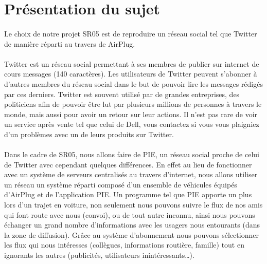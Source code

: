 
\section{Présentation du sujet}

\paragraph{}
Le choix de notre projet SR05 est de reproduire un réseau social tel que Twitter de manière réparti au travers de AirPlug.

\paragraph{}
Twitter est un réseau social permettant à ses membres de publier sur internet de cours messages (140 caractères). Les utilisateurs de Twitter peuvent s'abonner à d'autres membres du réseau social dans le but de pouvoir lire les messages rédigés par ces derniers.
Twitter est souvent utilisé par de grandes entreprises, des politiciens afin de pouvoir être lut par plusieurs millions de personnes à travers le monde, mais aussi pour avoir un retour sur leur actions. Il n'est pas rare de voir un service après vente tel que celui de Dell, vous contactez si vous vous plaigniez d'un problèmes avec un de leurs produits sur Twitter.

\paragraph{}
Dans le cadre de SR05, nous allons faire de PIE, un réseau social proche de celui de Twitter avec cependant quelques différences.
En effet au lieu de fonctionner avec un système de serveurs centralisés au travers d'internet, nous allons utiliser un réseau un système réparti composé d'un ensemble de véhicules équipés d'AirPlug et de l'application PIE.
Un programme tel que PIE apporte un plus lors d'un trajet en voiture, non seulement nous pouvons suivre le flux de nos amis qui font route avec nous (convoi), ou de tout autre inconnu, ainsi nous pouvons échanger un grand nombre d'informations avec les usagers nous entourants (dans la zone de diffusion). Grâce au système d'abonnement nous pouvons sélectionner les flux qui nous intéresses (collègues, informations routière, famille)  tout en ignorants les autres (publicités, utilisateurs inintéressants\ldots).

